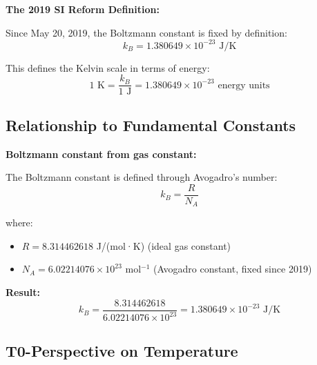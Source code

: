 \documentclass[12pt,a4paper]{article}
\begin{document}
	\begin{derivation}
		\textbf{The 2019 SI Reform Definition:}
		
		Since May 20, 2019, the Boltzmann constant is fixed by definition:
		\begin{equation}
			\boxed{k_B = 1.380649 \times 10^{-23} \text{ J/K}}
			\label{eq:kb_si}
		\end{equation}
		
		This defines the Kelvin scale in terms of energy:
		\begin{equation}
			1 \text{ K} = \frac{k_B}{1 \text{ J}} = 1.380649 \times 10^{-23} \text{ energy units}
		\end{equation}
	\end{derivation}
	
	\subsection{Relationship to Fundamental Constants}
	
	\begin{keyresult}
		\textbf{Boltzmann constant from gas constant:}
		
		The Boltzmann constant is defined through Avogadro's number:
		\begin{equation}
			k_B = \frac{R}{N_A}
		\end{equation}
		
		where:
		\begin{itemize}
			\item $R = 8.314462618$ J/(mol·K) (ideal gas constant)
			\item $N_A = 6.02214076 \times 10^{23}$ mol$^{-1}$ (Avogadro constant, fixed since 2019)
		\end{itemize}
		
		\textbf{Result:}
		\begin{equation}
			k_B = \frac{8.314462618}{6.02214076 \times 10^{23}} = 1.380649 \times 10^{-23} \text{ J/K}
		\end{equation}
	\end{keyresult}
	
	\subsection{T0-Perspective on Temperature}
	
\end{document}
